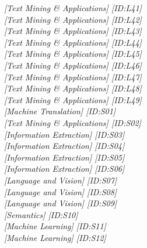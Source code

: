 \hfill \textit{[Text Mining \& Applications]  [ID:L41]} \\ 
\hfill \textit{[Text Mining \& Applications]  [ID:L42]} \\ 
\hfill \textit{[Text Mining \& Applications]  [ID:L43]} \\ 
\hfill \textit{[Text Mining \& Applications]  [ID:L44]} \\ 
\hfill \textit{[Text Mining \& Applications]  [ID:L45]} \\ 
\hfill \textit{[Text Mining \& Applications]  [ID:L46]} \\ 
\hfill \textit{[Text Mining \& Applications]  [ID:L47]} \\ 
\hfill \textit{[Text Mining \& Applications]  [ID:L48]} \\ 
\hfill \textit{[Text Mining \& Applications]  [ID:L49]} \\ 
\hfill \textit{[Machine Translation]  [ID:S01]} \\ 
\hfill \textit{[Text Mining \& Applications]  [ID:S02]} \\ 
\hfill \textit{[Information Extraction]  [ID:S03]} \\ 
\hfill \textit{[Information Extraction]  [ID:S04]} \\ 
\hfill \textit{[Information Extraction]  [ID:S05]} \\ 
\hfill \textit{[Information Extraction]  [ID:S06]} \\ 
\hfill \textit{[Language and Vision]  [ID:S07]} \\ 
\hfill \textit{[Language and Vision]  [ID:S08]} \\ 
\hfill \textit{[Language and Vision]  [ID:S09]} \\ 
\hfill \textit{[Semantics]  [ID:S10]} \\ 
\hfill \textit{[Machine Learning]  [ID:S11]} \\ 
\hfill \textit{[Machine Learning]  [ID:S12]} \\ 
